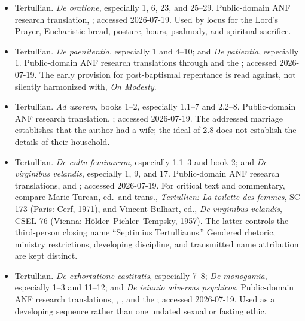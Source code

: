 \begin{itemize}
\item Tertullian. \emph{De oratione}, especially 1, 6, 23, and 25--29.
Public-domain ANF research translation,
; accessed
2026-07-19. Used by locus for the Lord's Prayer, Eucharistic bread, posture,
hours, psalmody, and spiritual sacrifice.

\item Tertullian. \emph{De paenitentia}, especially 1 and 4--10; and
\emph{De patientia}, especially 1. Public-domain ANF research translations
through  and the
; accessed
2026-07-19. The early provision for post-baptismal repentance is read against,
not silently harmonized with, \emph{On Modesty}.

\item Tertullian. \emph{Ad uxorem}, books 1--2, especially 1.1--7 and
2.2--8. Public-domain ANF research translation,
; accessed
2026-07-19. The addressed marriage establishes that the author had a wife; the
ideal of 2.8 does not establish the details of their household.

\item Tertullian. \emph{De cultu feminarum}, especially 1.1--3 and book 2;
and \emph{De virginibus velandis}, especially 1, 9, and 17. Public-domain ANF
research translations,
 and
; accessed 2026-07-19. For critical text and commentary, compare Marie
Turcan, ed.~and trans., \emph{Tertullien: La toilette des femmes}, SC 173
(Paris: Cerf, 1971), and Vincent Bulhart, ed., \emph{De virginibus velandis},
CSEL 76 (Vienna: H\"older--Pichler--Tempsky, 1957). The latter controls the
third-person closing name ``Septimius Tertullianus.'' Gendered rhetoric,
ministry restrictions, developing discipline, and transmitted name attribution
are kept distinct.

\item Tertullian. \emph{De exhortatione castitatis}, especially 7--8;
\emph{De monogamia}, especially 1--3 and 11--12; and \emph{De ieiunio adversus
psychicos}. Public-domain ANF research translations,
, , and the
; accessed
2026-07-19. Used as a developing sequence rather than one undated sexual or
fasting ethic.


\end{itemize}
